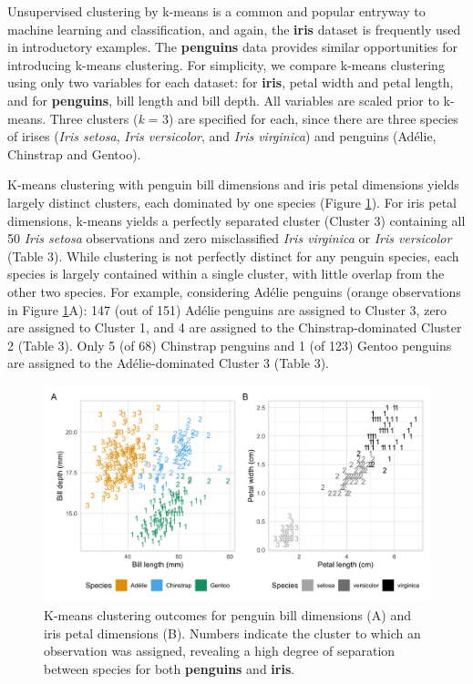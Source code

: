 Unsupervised clustering by k-means is a common and popular entryway to
machine learning and classification, and again, the \textbf{iris}
dataset is frequently used in introductory examples. The
\textbf{penguins} data provides similar opportunities for introducing
k-means clustering. For simplicity, we compare k-means clustering using
only two variables for each dataset: for \textbf{iris}, petal width and
petal length, and for \textbf{penguins}, bill length and bill depth. All
variables are scaled prior to k-means. Three clusters (\emph{k} = 3) are
specified for each, since there are three species of irises (\emph{Iris
setosa}, \emph{Iris versicolor}, and \emph{Iris virginica}) and penguins
(Adélie, Chinstrap and Gentoo).

K-means clustering with penguin bill dimensions and iris petal
dimensions yields largely distinct clusters, each dominated by one
species (Figure \ref{fig:kmeans}). For iris petal dimensions, k-means
yields a perfectly separated cluster (Cluster 3) containing all 50
\emph{Iris setosa} observations and zero misclassified \emph{Iris
virginica} or \emph{Iris versicolor} (Table 3). While clustering is not
perfectly distinct for any penguin species, each species is largely
contained within a single cluster, with little overlap from the other
two species. For example, considering Adélie penguins (orange
observations in Figure \ref{fig:kmeans}A): 147 (out of 151) Adélie
penguins are assigned to Cluster 3, zero are assigned to Cluster 1, and
4 are assigned to the Chinstrap-dominated Cluster 2 (Table 3). Only 5
(of 68) Chinstrap penguins and 1 (of 123) Gentoo penguins are assigned
to the Adélie-dominated Cluster 3 (Table 3).

\begin{Schunk}
\begin{figure}[htbp]

{\centering \includegraphics[width=\textwidth]{figs/kmeans-1} 

}

\caption[K-means clustering outcomes for penguin bill dimensions (A) and iris petal dimensions (B)]{K-means clustering outcomes for penguin bill dimensions (A) and iris petal dimensions (B). Numbers indicate the cluster to which an observation was assigned, revealing a high degree of separation between species for both \textbf{penguins} and \textbf{iris}.}\label{fig:kmeans}
\end{figure}
\end{Schunk}


